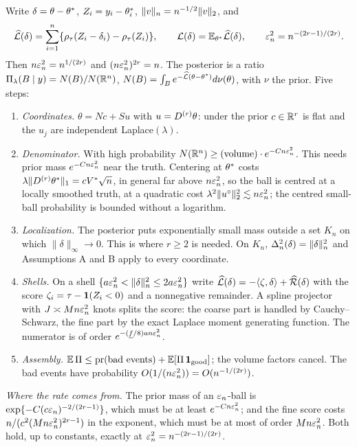 Write $\delta=\theta-\theta^{*}$, $Z_i=y_i-\theta^{*}_i$, $\|v\|_n=n^{-1/2}\|v\|_2$, and
\[
\widehat{\mathcal L}(\delta)=\sum_{i=1}^n\{\rho_\tau(Z_i-\delta_i)-\rho_\tau(Z_i)\},\qquad \mathcal L(\delta)=\mathbb{E}_{\theta^{*}}\widehat{\mathcal L}(\delta),\qquad \varepsilon_n^2=n^{-(2r-1)/(2r)}.
\]
Then $n\varepsilon_n^2=n^{1/(2r)}$ and $(n\varepsilon_n^2)^{2r}=n$. The posterior is a ratio $\Pi_\lambda(B\mid y)=N(B)/N(\mathbb{R}^n)$, $N(B)=\int_Be^{-\widehat{\mathcal L}(\theta-\theta^{*})}d\nu(\theta)$, with $\nu$ the prior. Five steps:
\begin{enumerate}
\renewcommand{\labelenumi}{\textbf{\arabic{enumi}.}}
\item \emph{Coordinates.} $\theta=Nc+Su$ with $u=D^{(r)}\theta$: under the prior $c\in\mathbb{R}^r$ is flat and the $u_j$ are independent Laplace$(\lambda)$.
\item \emph{Denominator.} With high probability $N(\mathbb{R}^n)\ge(\text{volume})\cdot e^{-Cn\varepsilon_n^2}$. This needs prior mass $e^{-Cn\varepsilon_n^2}$ near the truth. Centering at $\theta^{*}$ costs $\lambda\|D^{(r)}\theta^{*}\|_1=cV^{*}\sqrt n$, in general far above $n\varepsilon_n^2$, so the ball is centred at a locally smoothed truth, at a quadratic cost $\lambda^2\|u^\circ\|_2^2\lesssim n\varepsilon_n^2$; the centred small-ball probability is bounded without a logarithm.
\item \emph{Localization.} The posterior puts exponentially small mass outside a set $K_n$ on which $\|\delta\|_\infty\to0$. This is where $r\ge2$ is needed. On $K_n$, $\Delta_n^2(\delta)=\|\delta\|_n^2$ and Assumptions A and B apply to every coordinate.
\item \emph{Shells.} On a shell $\{a\varepsilon_n^2<\|\delta\|_n^2\le2a\varepsilon_n^2\}$ write $\widehat{\mathcal L}(\delta)=-\langle\zeta,\delta\rangle+\widehat{\mathcal R}(\delta)$ with the score $\zeta_i=\tau-\mathbf 1(Z_i<0)$ and a nonnegative remainder. A spline projector with $J\asymp Mn\varepsilon_n^2$ knots splits the score: the coarse part is handled by Cauchy--Schwarz, the fine part by the exact Laplace moment generating function. The numerator is of order $e^{-(\underline f/8)an\varepsilon_n^2}$.
\item \emph{Assembly.} $\mathbb{E}\,\Pi\le\mathrm{pr}(\text{bad events})+\mathbb{E}[\Pi\,\mathbf 1_{\rm good}]$; the volume factors cancel. The bad events have probability $O(1/(n\varepsilon_n^2))=O(n^{-1/(2r)})$.
\end{enumerate}
\emph{Where the rate comes from.} The prior mass of an $\varepsilon_n$-ball is $\exp\{-C(c\varepsilon_n)^{-2/(2r-1)}\}$, which must be at least $e^{-Cn\varepsilon_n^2}$; and the fine score costs $n/(c^2(Mn\varepsilon_n^2)^{2r-1})$ in the exponent, which must be at most of order $Mn\varepsilon_n^2$. Both hold, up to constants, exactly at $\varepsilon_n^2=n^{-(2r-1)/(2r)}$.

